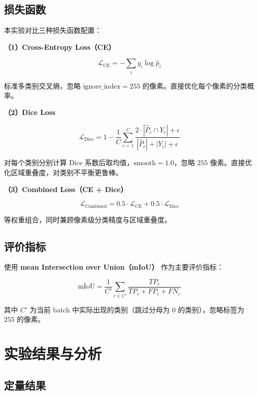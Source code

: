 \documentclass[UTF8,a4paper,12pt,fontset=fandol]{ctexart}
\begin{document}
\subsection{损失函数}

本实验对比三种损失函数配置：

\textbf{（1）Cross-Entropy Loss（CE）}

\begin{equation}
\mathcal{L}_{\text{CE}} = -\sum_{i} y_i \log \hat{p}_i
\end{equation}

标准多类别交叉熵，忽略 $\text{ignore\_index}=255$ 的像素。直接优化每个像素的分类概率。

\textbf{（2）Dice Loss}

\begin{equation}
\mathcal{L}_{\text{Dice}} = 1 - \frac{1}{C} \sum_{c=1}^{C} \frac{2 \cdot |\hat{P}_c \cap Y_c| + \epsilon}{|\hat{P}_c| + |Y_c| + \epsilon}
\end{equation}

对每个类别分别计算 Dice 系数后取均值，$\text{smooth}=1.0$，忽略 $255$ 像素。直接优化区域重叠度，对类别不平衡更鲁棒。

\textbf{（3）Combined Loss（CE + Dice）}

\begin{equation}
\mathcal{L}_{\text{Combined}} = 0.5 \cdot \mathcal{L}_{\text{CE}} + 0.5 \cdot \mathcal{L}_{\text{Dice}}
\end{equation}

等权重组合，同时兼顾像素级分类精度与区域重叠度。

\subsection{评价指标}

使用 \textbf{mean Intersection over Union（mIoU）} 作为主要评价指标：

\begin{equation}
\text{mIoU} = \frac{1}{C'} \sum_{c \in C'} \frac{TP_c}{TP_c + FP_c + FN_c}
\end{equation}

其中 $C'$ 为当前 batch 中实际出现的类别（跳过分母为 $0$ 的类别），忽略标签为 $255$ 的像素。

\section{实验结果与分析}

\subsection{定量结果}
\end{document}
